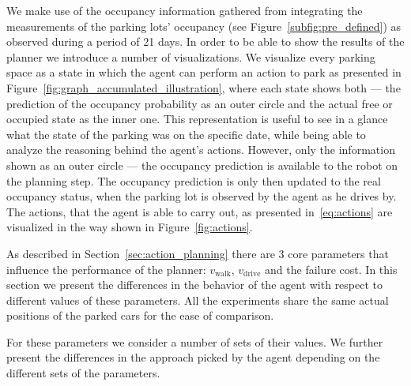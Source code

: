 We make use of the occupancy information gathered from integrating the
measurements of the parking lots' occupancy (see
Figure~\ref{subfig:pre_defined}) as observed during a period of 21 days. In
order to be able to show the results of the planner we introduce a number of
visualizations. We visualize every parking space as a state in which the agent
can perform an action to park as presented in
Figure~\ref{fig:graph_accumulated_illustration}, where each state shows both
--- the prediction of the occupancy probability as an outer circle and the
actual free or occupied state as the inner one. This representation is useful
to see in a glance what the state of the parking was on the specific date,
while being able to analyze the reasoning behind the agent's actions. However,
only the information shown as an outer circle --- the occupancy prediction is
available to the robot on the planning step. The occupancy prediction is only
then updated to the real occupancy status, when the parking lot is observed by
the agent as he drives by. The actions, that the agent is able to carry out,
as presented in~\eqref{eq:actions} are visualized in the way shown in
Figure~\ref{fig:actions}.


As described in Section~\ref{sec:action_planning} there are 3 core parameters
that influence the performance of the planner: $v_{\mathrm{walk}}$, $v_{\mathrm{drive}}$ and the
failure cost. In this section we present the differences in the behavior of
the agent with respect to different values of these parameters. All the
experiments share the same actual positions of the parked cars for the ease of
comparison.

For these parameters we consider a number of sets of their values. We further
present the differences in the approach picked by the agent depending on the
different sets of the parameters.

